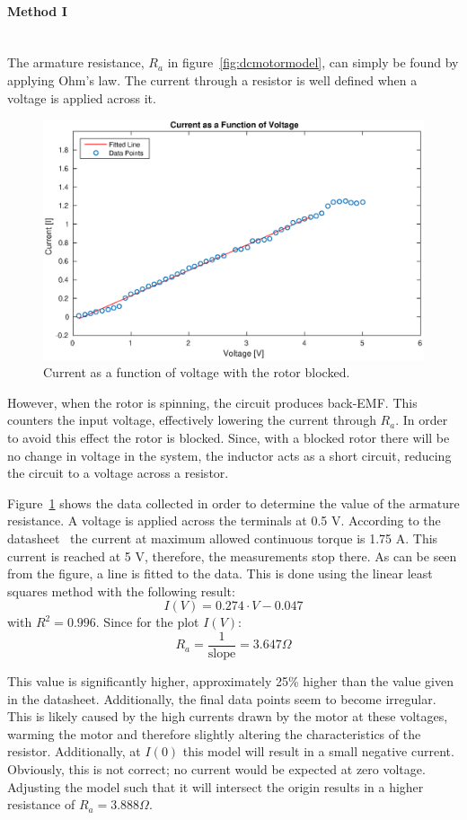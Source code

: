 \paragraph{Method I}~\\
The armature resistance, $R_a$ in figure~\ref{fig:dcmotormodel}, can simply be found by applying Ohm's law.
The current through a resistor is well defined when a voltage is applied across it.

\begin{figure}[!h]
	\centering
	\includegraphics[width=.75\linewidth]{graphics/raplot}
	\caption{Current as a function of voltage with the rotor blocked.}
	\label{fig:raplot}
\end{figure}

However, when the rotor is spinning, the circuit produces back-EMF.
This counters the input voltage, effectively lowering the current through $R_a$.
In order to avoid this effect the rotor is blocked.
Since, with a blocked rotor there will be no change in voltage in the system, the inductor acts as a short circuit, reducing the circuit to a voltage across a resistor. 

Figure~\ref{fig:raplot} shows the data collected in order to determine the value of the armature resistance.
A voltage is applied across the terminals at 0.5 V.
According to the datasheet~\cite{pittmann} the current at maximum allowed continuous torque is 1.75 A.
This current is reached at 5 V, therefore, the measurements stop there.
As can be seen from the figure, a line is fitted to the data.
This is done using the linear least squares method with the following result:
$$I(V)=0.274\cdot V-0.047$$
with $R^2=0.996$.
Since for the plot $I(V)$:
$$R_a = \frac{1}{\text{slope}} = 3.647\Omega$$

This value is significantly higher, approximately 25\% higher than the value given in the datasheet.
Additionally, the final data points seem to become irregular.
This is likely caused by the high currents drawn by the motor at these voltages, warming the motor and therefore slightly altering the characteristics of the resistor.
Additionally, at $I(0)$ this model will result in a small negative current.
Obviously, this is not correct; no current would be expected at zero voltage.
Adjusting the model such that it will intersect the origin results in a higher resistance of $R_a=3.888\Omega$.

